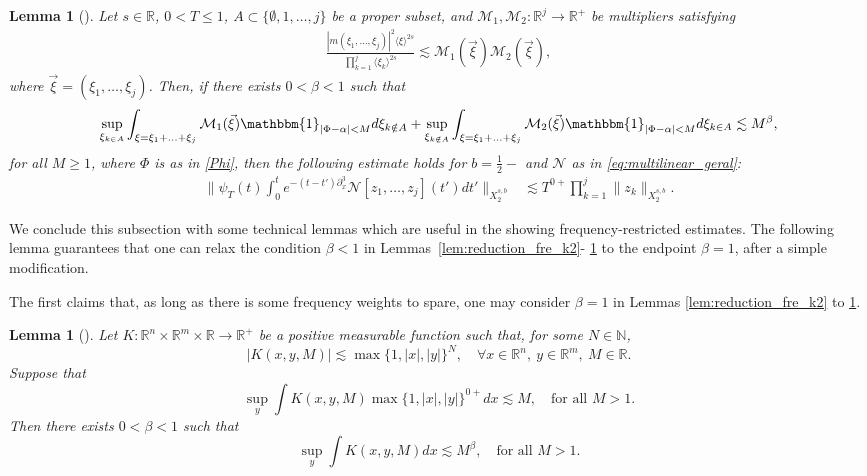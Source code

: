 \documentclass[%
11pt,  reqno]{amsart}
\newcommand{\jap}[1]{\langle #1 \rangle}
\newcommand{\5}{\textup{V}}
\newcommand{\les}{\lesssim}
\newtheorem{lemma}[theorem]{Lemma}
\theoremstyle{remark}
\newcommand{\R}{\mathbb{R}}
\newcommand{\be}{\beta}
\newcommand{\M}{\mathcal{M}}
\numberwithin{equation}{section}
\numberwithin{theorem}{section}
\newcommand{\Ncal}{\mathcal{N}}
\begin{document}
		
		\begin{lemma}[{\cite[Lemma 2]{COS}}]\label{lem:fre_tri}
			Let $s\in\R$, $0<T\le 1$, $A\subset \{\emptyset, 1, \ldots, j\}$ be a proper subset, and  $\M_1 , \M_2: \R^{j} \to \R^+$ be multipliers satisfying
            \begin{align}
            \frac{|m(\xi_1, \ldots, \xi_j)|^2\jap{\xi}^{2s}}{\prod_{k=1}^j\jap{\xi_{k}}^{2s}}
            \les 
                \M_1(\vec\xi) \M_2(\vec\xi)
                ,
            \end{align}
            where $\vec\xi=(\xi_1, \ldots, \xi_j)$. 
            Then, if there exists $0<\be<1$ such that
			$$
			\sup_{\xi_{k\in A}} \int_{\xi=\xi_1+\ldots + \xi_j} \mathcal{M}_1 (\vec\xi) \mathbbm{1}_{|\Phi-\alpha|<M} d\xi_{k\notin A} + \sup_{\xi_{k\notin A}} \int_{\xi=\xi_1+\ldots+\xi_j} \mathcal{M}_2 (\vec\xi) \mathbbm{1}_{|\Phi-\alpha|<M} d\xi_{k\in A} \lesssim M^\beta, 
			$$
            for all $M\ge 1$, 
            where $\Phi$ is as in \eqref{Phi}, 
			then the following estimate holds for $b=\frac12-$ and $\Ncal$ as in \eqref{eq:multilinear_geral}:
            \begin{align}
				\bigg\|\psi_T(t)\int_0^te^{-(t-t')\partial_x^3}\Ncal[z_1,\dots, z_j](t')dt' \bigg\|_{X^{s,b}_{2}} & \les T^{0+}\prod_{k=1}^j\|z_k\|_{X^{s,b}_{2}}.
			\end{align} 
		\end{lemma}
		


    
         
		We conclude this subsection with some technical lemmas which are useful in the showing frequency-restricted estimates.
        The following lemma guarantees that one can relax the condition $\be<1$ in Lemmas~\ref{lem:reduction_fre_k2}-
        \ref{lem:fre_tri} 
        to the endpoint $\be=1$, after a simple modification. 
        
        The first claims that, as long as there is some frequency weights to spare, one may consider $\beta=1$ in Lemmas \ref{lem:reduction_fre_k2} to \ref{lem:fre_tri}.
		
		\begin{lemma}[{\cite[Lemma 3.3]{CLS}}]\label{lem:eta1}
			Let $K:\R^n\times \R^m\times \R\to \R^+$ be a positive measurable function such that, for some $N\in \mathbb{N}$,
			$$
			|K(x,y,M)|\lesssim \max\{1,|x|,|y|\}^N,\quad \forall x\in\R^n,\ y\in \R^m, \ M\in \R.
			$$
			Suppose that
			$$
			\sup_y \int K(x,y,M)\max\{1,|x|,|y|\}^{0+} dx \lesssim M,\quad \mbox{for all }M>1.
			$$
			Then there exists $0<\beta<1$ such that
			$$
			\sup_y \int K(x,y,M) dx \lesssim M^{\beta},\quad \mbox{for all } M>1.
			$$
		\end{lemma}
		
\end{document}
